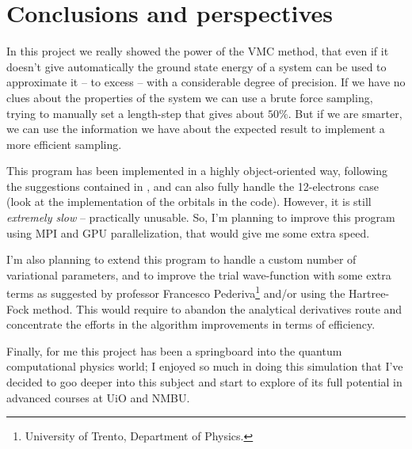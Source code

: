 \documentclass[a4paper,twoside,11pt]{book}
\begin{document}
\chapter{Conclusions and perspectives}
In this project we really showed the power of the VMC method, that even if it doesn't give automatically the ground state energy of a system can be used to approximate it -- to excess -- with a considerable degree of precision. If we have no clues about the properties of the system we can use a brute force sampling, trying to manually set a length-step that gives about $50\%$. But if we are smarter, we can use the information we have about the expected result to implement a more efficient sampling.

This program has been implemented in a highly object-oriented way, following the suggestions contained in \cite{jorgen}, and can also fully handle the 12-electrons case (look at the implementation of the orbitals in the code). However, it is still \emph{extremely slow} -- practically unusable. So, I'm planning to improve this program using MPI and GPU parallelization, that would give me some extra speed.

I'm also planning to extend this program to handle a custom number of variational parameters, and to improve the trial wave-function with some extra terms as suggested by professor Francesco Pederiva\footnote{University of Trento, Department of Physics.} and/or using the Hartree-Fock method. This would require to abandon the analytical derivatives route and concentrate the efforts in the algorithm improvements in terms of efficiency.

Finally, for me this project has been a springboard into the quantum computational physics world; I enjoyed so much in doing this simulation that I've decided to goo deeper into this subject and start to explore of its full potential in advanced courses at UiO and NMBU.












\newpage
\end{document}
